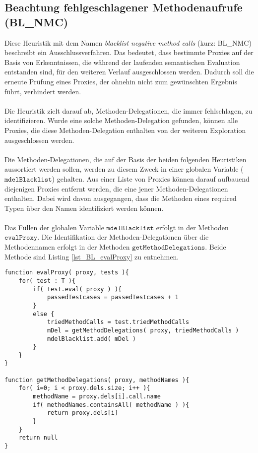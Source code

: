 \subsection{Beachtung fehlgeschlagener Methodenaufrufe (BL\_NMC)}\label{sec_bl_mnc}
Diese Heuristik mit dem Namen \emph{blacklist negative method calls} (kurz: BL\_NMC) beschreibt ein Ausschlussverfahren. Das bedeutet, dass bestimmte Proxies auf der Basis von Erkenntnissen, die während der laufenden semantischen Evaluation entstanden sind, für den weiteren Verlauf ausgeschlossen werden. Dadurch soll die erneute Prüfung eines Proxies, der ohnehin nicht zum gewünschten Ergebnis führt, verhindert werden.
\\\\
Die Heuristik zielt darauf ab, Methoden-Delegationen, die immer fehlschlagen, zu identifizieren. Wurde eine solche Methoden-Delegation gefunden, können alle Proxies, die diese Methoden-Delegation enthalten von der weiteren Exploration ausgeschlossen werden.
\\\\
Die Methoden-Delegationen, die auf der Basis der beiden folgenden Heuristiken aussortiert werden sollen, werden zu diesem Zweck in einer globalen Variable ($\texttt{mdelBlacklist}$) gehalten. Aus einer Liste von Proxies können darauf aufbauend diejenigen Proxies entfernt werden, die eine jener Methoden-Delegationen enthalten. Dabei wird davon ausgegangen, dass die Methoden eines required Typen über den Namen identifiziert werden können.
\\\\
Das Füllen der globalen Variable $\texttt{mdelBlacklist}$ erfolgt in der Methoden $\texttt{evalProxy}$. Die Identifikation der Methoden-Delegationen über die Methodennamen erfolgt in der Methoden $\texttt{getMethodDelegations}$. Beide Methode sind Listing \ref{lst_BL_evalProxy} zu entnehmen.
\begin{lstlisting}[style = pseudo, caption = Evaluierung einzelner Proxies mit BL\_MNC, captionpos = b, label = lst_BL_evalProxy]
function evalProxy( proxy, tests ){
	for( test : T ){	
		if( test.eval( proxy ) ){
			passedTestcases = passedTestcases + 1
		}
		else {
			triedMethodCalls = test.triedMethodCalls
			mDel = getMethodDelegations( proxy, triedMethodCalls )
			mdelBlacklist.add( mDel )
		}		
	}
}

function getMethodDelegations( proxy, methodNames ){
	for( i=0; i < proxy.dels.size; i++ ){
		methodName = proxy.dels[i].call.name
		if( methodNames.containsAll( methodName ) ){
			return proxy.dels[i]
		}
	}
	return null
}
\end{lstlisting}
